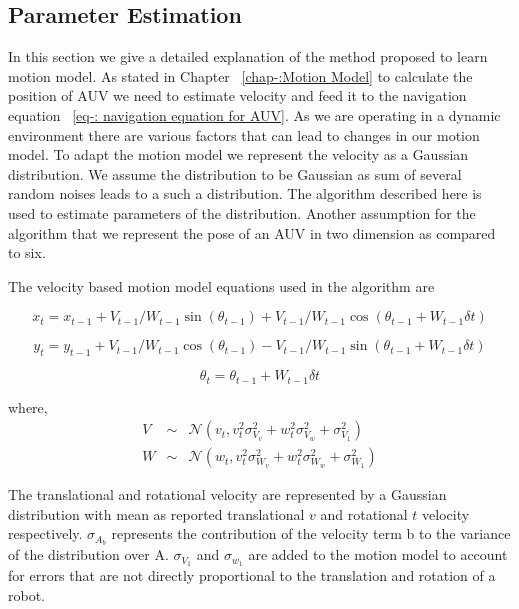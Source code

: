 \documentclass[12pt]{dalcsthesis}
\begin{document}
\subsection{Parameter Estimation}
\label{ch:adapting the motion model}
In this section we give a detailed explanation of the method proposed to learn motion model. As stated in Chapter ~\ref{chap-:Motion Model} to calculate the position of AUV we need to estimate velocity and feed it to the navigation equation ~\ref{eq-: navigation equation for AUV}. As we are operating in a dynamic environment there are various factors that can lead to changes in our motion model. To adapt the motion model we represent the velocity as a Gaussian distribution. We assume the distribution to be Gaussian as sum of several random noises leads to a such a distribution.   The algorithm described here is used to estimate parameters of the distribution. Another assumption for the algorithm that we represent the pose of an AUV in two dimension as compared to six. 

The velocity based motion model equations used in the algorithm are 

\begin{equation}
 x_{t}=x_{t-1}+V_{t-1}/W_{t-1} \sin(\theta_{t-1})+ V_{t-1}/W_{t-1} \cos(\theta_{t-1} + W_{t-1} \delta t)
\end{equation}

\begin{equation}
\label{eq:velocity motion model_y}
y_{t}=y_{t-1}+V_{t-1}/W_{t-1} \cos(\theta_{t-1})- V_{t-1}/W_{t-1} \sin(\theta_{t-1} + W_{t-1} \delta t)
\end{equation}

\begin{equation}
\label{eq:velocity motion model_theta}
\theta_{t}=\theta_{t-1}+ W_{t-1} \delta t
\end{equation}

where,
\begin{eqnarray}
V &\sim& \mathcal{N}(v_{t},v_{t}^{2}\sigma_{V_{v}}^{2}+w_{t}^{2}\sigma_{V_{w}}^{2}+\sigma_{V_{1}}^{2})\\
W &\sim& \mathcal{N}(w_{t},v_{t}^{2}\sigma_{W_{v}}^{2}+w_{t}^{2}\sigma_{W_{w}}^{2}+\sigma_{W_{1}}^{2})
\end{eqnarray}

The translational and rotational velocity are represented by a Gaussian distribution with mean as reported translational $v$ and rotational $t$ velocity respectively. $\sigma_{A_{b}}$ represents the contribution of the velocity term b to the variance of the distribution over A. $\sigma_{V_{1}} $ and $\sigma_{w_{1}}$ are added to the motion model to account for errors that are not directly proportional to the translation and rotation of a robot.
\end{document}
